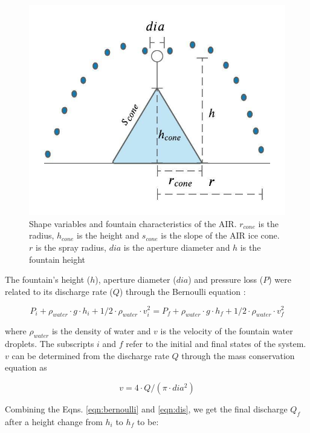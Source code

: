 \documentclass[tc, manuscript]{copernicus}
\begin{document}
\begin{figure}[t]
\includegraphics[width=12cm]{Figures/Fountain characteristics.jpeg}

\caption{Shape variables and fountain characteristics of the AIR. $r_{cone}$ is the radius, $h_{cone}$ is the
height and $s_{cone}$ is the slope of the AIR ice cone. $r$ is the spray radius, $dia$ is the aperture diameter
and $h$ is the fountain height}

\label{fig:fchar}
\end{figure}

The fountain's height ($h$), aperture diameter ($dia$) and pressure loss ($P$) were related to its discharge
rate ($Q$) through the Bernoulli equation :

\begin{equation}
  \label{eqn:bernoulli}
  P_{i} + \rho_{water} \cdot g \cdot h_{i} + 1/2 \cdot \rho_{water} \cdot v_{i}^2 = P_{f} + \rho_{water} \cdot g
  \cdot h_{f} + 1/2 \cdot \rho_{water} \cdot v_{f}^2
\end{equation}

where $\rho_{water}$ is the density of water and $v$ is the velocity of the fountain water droplets. The
subscripts $i$ and $f$ refer to the initial and final states of the system. $v$ can be determined from the
discharge rate $Q$ through the mass conservation equation as 

\begin{equation}
	\label{eqn:dis}
 v = 4 \cdot Q/(\pi \cdot dia^2)
\end{equation}

Combining the Eqns. \ref{eqn:bernoulli} and \ref{eqn:dis}, we get the final discharge $Q_f$ after a height change
from $h_i$ to $h_f$ to be:
\end{document}
